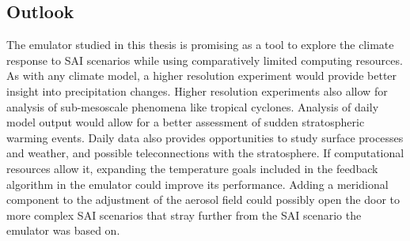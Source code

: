\subsection{Outlook}
The emulator studied in this thesis is promising as a tool to explore the climate response to SAI scenarios while using comparatively limited computing resources. As with any climate model, a higher resolution experiment would provide better insight into precipitation changes. Higher resolution experiments also allow for analysis of sub-mesoscale phenomena like tropical cyclones. Analysis of daily model output would allow for a better assessment of sudden stratospheric warming events. Daily data also provides opportunities to study surface processes and weather, and possible teleconnections with the stratosphere. 
If computational resources allow it, expanding the temperature goals included in the feedback algorithm in the emulator could improve its performance. Adding a meridional component to the adjustment of the aerosol field could possibly open the door to more complex SAI scenarios that stray further from the SAI scenario the emulator was based on.

